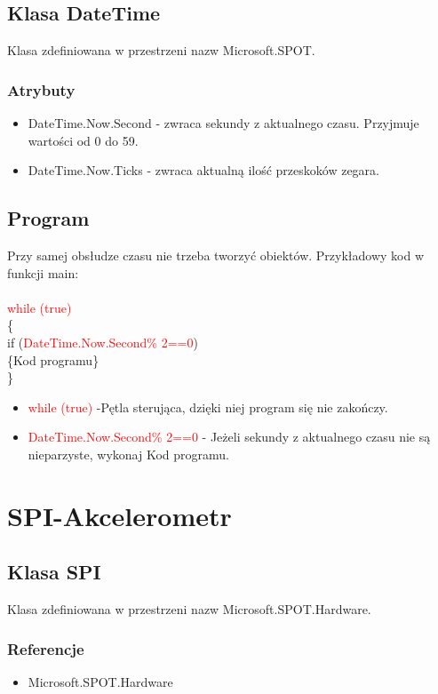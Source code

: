 \documentclass{article}
\begin{document}
\subsection{Klasa DateTime} 
Klasa zdefiniowana w przestrzeni nazw Microsoft.SPOT.
\subsubsection{Atrybuty}
\begin{itemize}
\item DateTime.Now.Second - zwraca sekundy z aktualnego czasu. Przyjmuje wartości od 0 do 59.
\item DateTime.Now.Ticks - zwraca aktualną ilość przeskoków zegara. 
\end{itemize}
\subsection{Program}
Przy samej obsłudze czasu nie trzeba tworzyć obiektów. Przykładowy kod w funkcji main:\\\\
 \textcolor{red}{while (true)}\\
            \{\\
                if (\textcolor{red}{DateTime.Now.Second\% 2==0})\\
				\{Kod programu\}\\
	\}
\begin{itemize}
\item \textcolor{red}{while (true)} -Pętla sterująca, dzięki niej program się nie zakończy.
\item \textcolor{red}{DateTime.Now.Second\% 2==0} - Jeżeli sekundy z aktualnego czasu nie są nieparzyste, wykonaj Kod programu.
\end{itemize}

\section{SPI-Akcelerometr}
\subsection{Klasa SPI}
Klasa zdefiniowana w przestrzeni nazw Microsoft.SPOT.Hardware. 
\subsubsection{Referencje}
\begin{itemize}
\item Microsoft.SPOT.Hardware
\end{itemize}
\end{document}

